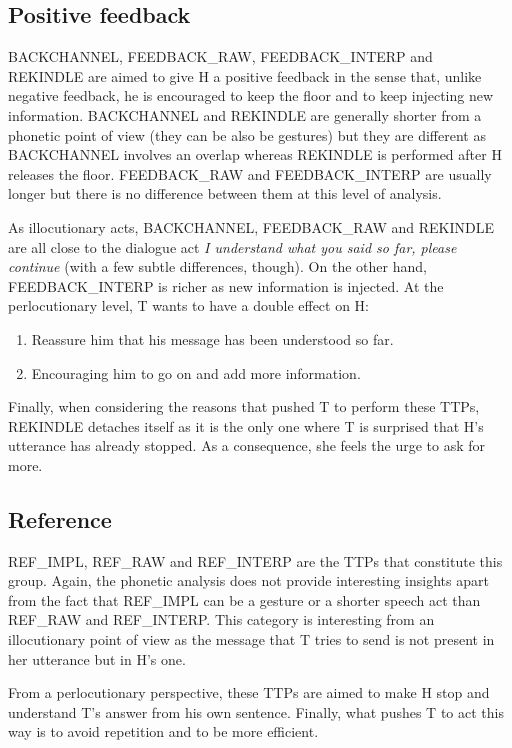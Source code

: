     \subsection{Positive feedback}
		
					BACKCHANNEL, FEEDBACK\_RAW, FEEDBACK\_INTERP and REKINDLE are aimed to give H a positive feedback in the sense that, unlike negative feedback, he is encouraged to keep the floor and to keep injecting new information. BACKCHANNEL and REKINDLE are generally shorter from a phonetic point of view (they can be also be gestures) but they are different as BACKCHANNEL involves an overlap whereas REKINDLE is performed after H releases the floor. FEEDBACK\_RAW and FEEDBACK\_INTERP are usually longer but there is no difference between them at this level of analysis.
					
					As illocutionary acts, BACKCHANNEL, FEEDBACK\_RAW and REKINDLE are all close to the dialogue act \textit{I understand what you said so far, please continue} (with a few subtle differences, though). On the other hand, FEEDBACK\_INTERP is richer as new information is injected. At the perlocutionary level, T wants to have a double effect on H:
					\begin{enumerate}
						\item Reassure him that his message has been understood so far.
						\item Encouraging him to go on and add more information.
					\end{enumerate}
					
					Finally, when considering the reasons that pushed T to perform these TTPs, REKINDLE detaches itself as it is the only one where T is surprised that H's utterance has already stopped. As a consequence, she feels the urge to ask for more.

    \subsection{Reference}
		
					REF\_IMPL, REF\_RAW and REF\_INTERP are the TTPs that constitute this group. Again, the phonetic analysis does not provide interesting insights apart from the fact that REF\_IMPL can be a gesture or a shorter speech act than REF\_RAW and REF\_INTERP. This category is interesting from an illocutionary point of view as the message that T tries to send is not present in her utterance but in H's one.
					
					From a perlocutionary perspective, these TTPs are aimed to make H stop and understand T's answer from his own sentence. Finally, what pushes T to act this way is to avoid repetition and to be more efficient.

